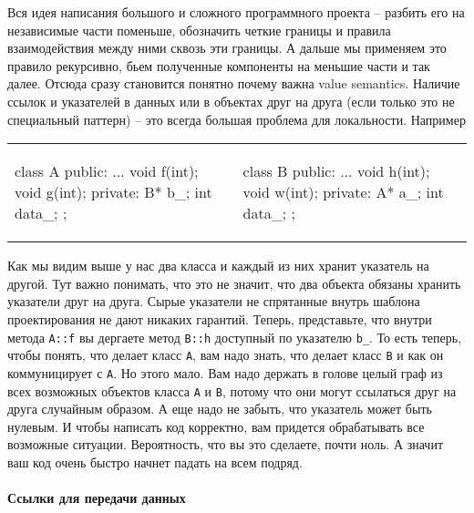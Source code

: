 Вся идея написания большого и сложного программного проекта -- разбить его на независимые части поменьше, обозначить четкие границы и правила взаимодействия между ними сквозь эти границы.
А дальше мы применяем это правило рекурсивно, бьем полученные компоненты на меньшие части и так далее.
Отсюда сразу становится понятно почему важна value semantics.
Наличие ссылок и указателей в данных или в объектах друг на друга (если только это не специальный паттерн) -- это всегда большая проблема для локальности.
Например
\begin{center}
\begin{tabular}{ll}
{
\begin{minipage}[\baselineskip]{8cm}
\begin{cppcode}[numbers = none]
class A {
public:
  ...
  void f(int);
  void g(int);
private:
  B* b_;
  int data_;
};
\end{cppcode}
\end{minipage}
}&{
\begin{minipage}[\baselineskip]{8cm}
\begin{cppcode}[numbers = none]
class B {
public:
  ...
  void h(int);
  void w(int);
private:
  A* a_;
  int data_;
};
\end{cppcode}
\end{minipage}
}\\
\end{tabular}
\end{center}
Как мы видим выше у нас два класса и каждый из них хранит указатель на другой.
Тут важно понимать, что это не значит, что два объекта обязаны хранить указатели друг на друга.
Сырые указатели не спрятанные внутрь шаблона проектирования не дают никаких гарантий.
Теперь, представьте, что внутри метода \verb"A::f" вы дергаете метод \verb"B::h" доступный по указателю \verb"b_".
То есть теперь, чтобы понять, что делает класс \verb"A", вам надо знать, что делает класс \verb"B" и как он коммуницирует с \verb"A".
Но этого мало.
Вам надо держать в голове целый граф из всех возможных объектов класса \verb"A" и \verb"B", потому что они могут ссылаться друг на друга случайным образом.
А еще надо не забыть, что указатель может быть нулевым.
И чтобы написать код корректно, вам придется обрабатывать все возможные ситуации.
Вероятность, что вы это сделаете, почти ноль.
А значит ваш код очень быстро начнет падать на всем подряд.

\paragraph{Ссылки для передачи данных}

